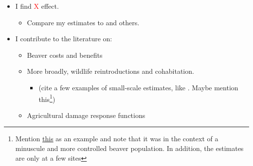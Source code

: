 \begin{itemize}
    \item I find \textcolor{red}{X} effect.
    \begin{itemize}
        \item Compare my estimates to \citep{hamilton_tayside_2015} and others.
    \end{itemize}
    \item I contribute to the literature on:
    \begin{itemize}
        \item Beaver costs and benefits
        \item More broadly, wildlife reintroductions and cohabitation. 
        \begin{itemize}
            \item (cite a few examples of small-scale estimates, like \citep{hamilton_tayside_2015}. Maybe mention this\footnote{Mention \href{https://www.exeter.ac.uk/media/universityofexeter/research/microsites/creww/riverottertrial/appendix1/Beavers_and_Agriculture.pdf}{this} as an example and note that it was in the context of a minuscule and more controlled beaver population. In addition, the estimates are only at a few sites})
        \end{itemize}
        \item Agricultural damage response functions
    \end{itemize}
    
\end{itemize}